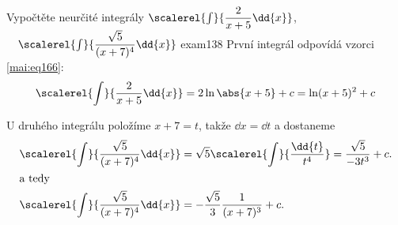 \begin{mathexam}{Vypočtěte neurčité integrály \(\scalerel{\int}{\dfrac{2}{x+5}\dd{x}}\),
  \(\quad\scalerel{\int}{\dfrac{\sqrt{5}}{(x+7)^4}\dd{x}}\) \hfill\cite[s.~71]{Knichal}}{exam138}
    První integrál odpovídá vzorci \ref{mai:eq166}:
    \begin{equation*}
      \scalerel{\int}{\dfrac{2}{x+5}\dd{x}} = 2\ln\abs{x+5} + c = \ln(x+5)^2 + c
    \end{equation*}

    U druhého integrálu položíme \(x+7 = t\), takže \(\dd{x} = \dd{t}\) a dostaneme
    \begin{align*}
      \scalerel{\int}{\dfrac{\sqrt{5}}{(x+7)^4}\dd{x}} &= 
      \sqrt{5}\scalerel{\int}{\dfrac{\dd{t}}{t^4}} = \dfrac{\sqrt{5}}{-3t^3} + c.   \\
      \shortintertext{a tedy}
      \scalerel{\int}{\dfrac{\sqrt{5}}{(x+7)^4}\dd{x}} &=-\dfrac{\sqrt{5}}{3}\dfrac{1}{(x+7)^3} + c.
    \end{align*}
\end{mathexam}